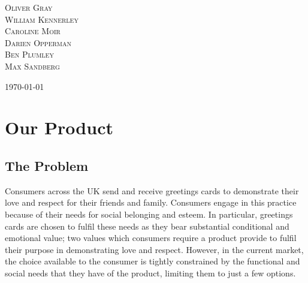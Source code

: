 \documentclass[10pt, a4paper]{article}
\begin{document}
\begin{titlepage}


	\vspace{0.5\baselineskip} %

{\scshape\Large Oliver Gray\\ }
{\scshape\Large William Kennerley\\}
{\scshape\Large Caroline Moir\\}
{\scshape\Large Darien Opperman\\ }
{\scshape\Large Ben Plumley\\}
{\scshape\Large Max Sandberg\\}



	\vspace{1.0\baselineskip} %


	\vfill %



	\vspace{0.3\baselineskip} %

	\today


\end{titlepage}


\raggedright
\setlength{\parskip}{6pt}
\setlength{\parindent}{0pt}

\section*{Our Product}
\subsection*{The Problem}
Consumers across the UK send and receive greetings cards to demonstrate their love and respect for their friends and family. Consumers engage in this practice because of their needs for social belonging and esteem. In particular, greetings cards are chosen to fulfil these needs as they bear substantial conditional and emotional value; two values which consumers require a product provide to fulfil their purpose in demonstrating love and respect. However, in the current market, the choice available to the consumer is tightly constrained by the functional and social needs that they have of the product, limiting them to just a few options.
\end{document}
